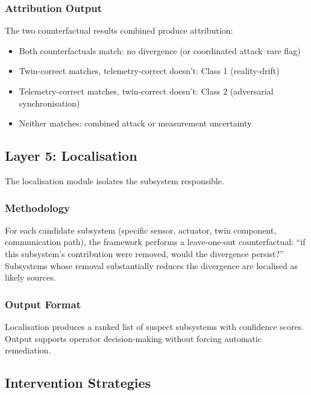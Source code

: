 \documentclass[sigconf,nonacm]{acmart}
\begin{document}
\subsubsection{Attribution Output}

The two counterfactual results combined produce attribution:

\begin{itemize}
  \item Both counterfactuals match: no divergence (or coordinated
        attack--rare flag)
  \item Twin-correct matches, telemetry-correct doesn't: Class 1
        (reality-drift)
  \item Telemetry-correct matches, twin-correct doesn't: Class 2
        (adversarial synchronisation)
  \item Neither matches: combined attack or measurement
        uncertainty
\end{itemize}

\subsection{Layer 5: Localisation}

The localisation module isolates the subsystem responsible.

\subsubsection{Methodology}

For each candidate subsystem (specific sensor, actuator, twin
component, communication path), the framework performs a leave-one-out
counterfactual: ``if this subsystem's contribution were removed,
would the divergence persist?'' Subsystems whose removal
substantially reduces the divergence are localised as likely
sources.

\subsubsection{Output Format}

Localisation produces a ranked list of suspect subsystems with
confidence scores. Output supports operator decision-making
without forcing automatic remediation.

\subsection{Intervention Strategies}
\end{document}
